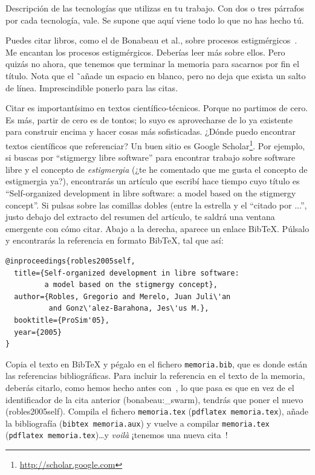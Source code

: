 \documentclass[a4paper, 12pt]{book}
\begin{document}
Descripción de las tecnologías que utilizas en tu trabajo. 
Con dos o tres párrafos por cada tecnología, vale. 
Se supone que aquí viene todo lo que no has hecho tú.

Puedes citar libros, como el de Bonabeau et al., sobre procesos estigmérgicos~\cite{bonabeau:_swarm}. 
Me encantan los procesos estigmérgicos.
Deberías leer más sobre ellos.
Pero quizás no ahora, que tenemos que terminar la memoria para sacarnos por fin el título.
Nota que el \~ \ añade un espacio en blanco, pero no deja que exista un salto de línea. 
Imprescindible ponerlo para las citas.

Citar es importantísimo en textos científico-técnicos. 
Porque no partimos de cero.
Es más, partir de cero es de tontos; lo suyo es aprovecharse de lo ya existente para construir encima y hacer cosas más sofisticadas.
¿Dónde puedo encontrar textos científicos que referenciar?
Un buen sitio es Google Scholar\footnote{\url{http://scholar.google.com}}.
Por ejemplo, si buscas por ``stigmergy libre software'' para encontrar trabajo sobre software libre y el concepto de \emph{estigmergia} (¿te he comentado que me gusta el concepto de estigmergia ya?), encontrarás un artículo que escribí hace tiempo cuyo título es ``Self-organized development in libre software: a model based on the stigmergy concept''.
Si pulsas sobre las comillas dobles (entre la estrella y el ``citado por ...'', justo debajo del extracto del resumen del artículo, te saldrá una ventana emergente con cómo citar.
Abajo a la derecha, aparece un enlace BibTeX.
Púlsalo y encontrarás la referencia en formato BibTeX, tal que así:

\clearpage
{\footnotesize
\begin{verbatim}
@inproceedings{robles2005self,
  title={Self-organized development in libre software:
         a model based on the stigmergy concept},
  author={Robles, Gregorio and Merelo, Juan Juli\'an 
          and Gonz\'alez-Barahona, Jes\'us M.},
  booktitle={ProSim'05},
  year={2005}
}
\end{verbatim}
}

Copia el texto en BibTeX y pégalo en el fichero \texttt{memoria.bib}, que es donde están las referencias bibliográficas.
Para incluir la referencia en el texto de la memoria, deberás citarlo, como hemos hecho antes con~\cite{bonabeau:_swarm}, lo que pasa es que en vez de el identificador de la cita anterior (bonabeau:\_swarm), tendrás que poner el nuevo (robles2005self).
Compila el fichero \texttt{memoria.tex} (\texttt{pdflatex memoria.tex}), añade la bibliografía (\texttt{bibtex memoria.aux}) y vuelve a compilar \texttt{memoria.tex} (\texttt{pdflatex memoria.tex})\ldots y \emph{voilà} ¡tenemos una nueva cita~\cite{robles2005self}!
\end{document}
